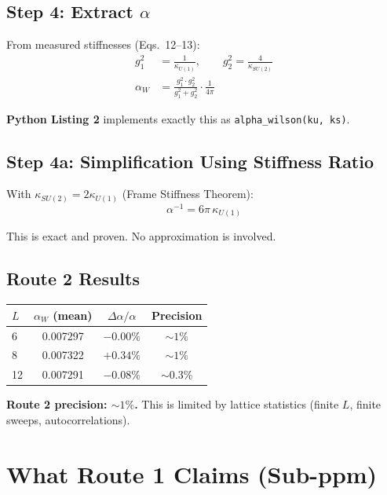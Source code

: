 \documentclass[12pt,a4paper]{article}
\begin{document}
\subsection{Step 4: Extract $\alpha$}

From measured stiffnesses (Eqs.~12--13):
\begin{align}
g_1^2 &= \frac{1}{\kappa_{U(1)}}, \qquad
g_2^2 = \frac{4}{\kappa_{SU(2)}} \\[6pt]
\alpha_W &= \frac{g_1^2 \cdot g_2^2}{g_1^2 + g_2^2} \cdot \frac{1}{4\pi}
\end{align}

\textbf{Python Listing 2} implements exactly this as
\texttt{alpha\_wilson(ku, ks)}.

\subsection{Step 4a: Simplification Using Stiffness Ratio}

With $\kappa_{SU(2)} = 2\kappa_{U(1)}$ (Frame Stiffness Theorem):
\begin{equation}
\boxed{\alpha^{-1} = 6\pi\,\kappa_{U(1)}}
\end{equation}

This is exact and proven. No approximation is involved.

\subsection{Route 2 Results}

\begin{center}
\begin{tabular}{lccc}
\toprule
$L$ & $\alpha_W$ (mean) & $\Delta\alpha/\alpha$ & Precision \\
\midrule
6 & 0.007297 & $-0.00\%$ & $\sim 1\%$ \\
8 & 0.007322 & $+0.34\%$ & $\sim 1\%$ \\
12 & 0.007291 & $-0.08\%$ & $\sim 0.3\%$ \\
\bottomrule
\end{tabular}
\end{center}

\textbf{Route 2 precision: $\sim 1\%$.} This is limited by lattice
statistics (finite $L$, finite sweeps, autocorrelations).

\section{What Route 1 Claims (Sub-ppm)}
\label{sec:route1}
\end{document}
